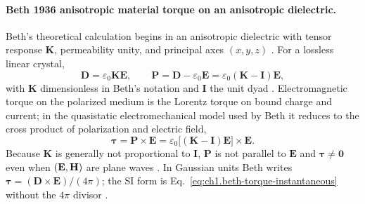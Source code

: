 \paragraph{Beth 1936 anisotropic material torque on an anisotropic dielectric.}
Beth's theoretical calculation begins in an anisotropic dielectric with tensor response $\mathbf K$, permeability unity, and principal axes $(x,y,z)$ \cite{beth1936}. For a lossless linear crystal,
\begin{equation}
\label{eq:ch1.beth-D-constitutive}
\mathbf D=\varepsilon_0\mathbf K\mathbf E,
\qquad
\mathbf P=\mathbf D-\varepsilon_0\mathbf E
=\varepsilon_0(\mathbf K-\mathbf I)\mathbf E,
\end{equation}
with $\mathbf K$ dimensionless in Beth's notation and $\mathbf I$ the unit dyad \cite{beth1936,stratton1941}. Electromagnetic torque on the polarized medium is the Lorentz torque on bound charge and current; in the quasistatic electromechanical model used by Beth it reduces to the cross product of polarization and electric field,
\begin{equation}
\label{eq:ch1.beth-torque-instantaneous}
\boldsymbol\tau=\mathbf P\times\mathbf E
=\varepsilon_0\bigl[(\mathbf K-\mathbf I)\mathbf E\bigr]\times\mathbf E.
\end{equation}
Because $\mathbf K$ is generally not proportional to $\mathbf I$, $\mathbf P$ is not parallel to $\mathbf E$ and $\boldsymbol\tau\neq\mathbf{0}$ even when $(\mathbf{E},\mathbf{H})$ are plane waves \cite{beth1936}. In Gaussian units Beth writes $\boldsymbol\tau=(\mathbf D\times\mathbf E)/(4\pi)$; the SI form is Eq.~\eqref{eq:ch1.beth-torque-instantaneous} without the $4\pi$ divisor \cite{beth1936,stratton1941}.

